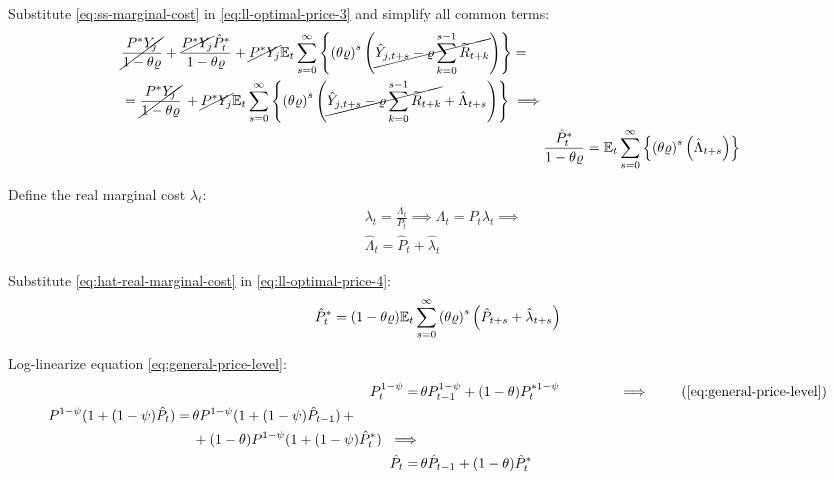 \documentclass[
	thesis.tex
	]{subfiles}
\begin{document}
Substitute \ref{eq:ss-marginal-cost} in \ref{eq:ll-optimal-price-3} and simplify all common terms:
\begin{align}
	\begin{split}
		& \cancel{\frac{P^\ast Y_{j}}{1-\theta\varrho}} + \frac{ \cancel{P^\ast Y_{j}} \hat{P}_t^\ast }{1- \theta \varrho} + \cancel{P^\ast Y_{j}} {\mathbb{E}_{t}} \sum_{s=0}^{\infty} \left\{ \left( \theta \varrho \right)^s \left( \cancel{\hat{Y}_{j,t+s} - \varrho \sum_{k=0}^{s-1} \widetilde{R}_{t+k}} \right) \right\} = 
		\\
		& = \cancel{\frac{P^\ast Y_{j}}{1-\theta\varrho}} \, + \cancel{P^\ast Y_{j}} {\mathbb{E}_{t}} \sum_{s=0}^{\infty} \left\{ \left( \theta \varrho \right)^s \left( \cancel{\hat{Y}_{j,t+s} - \varrho \sum_{k=0}^{s-1} \widetilde{R}_{t+k}} + \hat{\Lambda}_{t+s} \right) \right\} \implies	
	\end{split} \nonumber \\
	& \frac{ \hat{P}_t^\ast }{1- \theta \varrho} = {\mathbb{E}_{t}} \sum_{s=0}^{\infty} \left\{ \left( \theta \varrho \right)^s \left( \hat{\Lambda}_{t+s} \right) \right\} \label{eq:ll-optimal-price-4}
\end{align}

Define the real marginal cost $\lambda_t$:
\begin{align}
	& \lambda_t = \frac{\Lambda_t}{P_t} \implies \Lambda_t = P_t \lambda_t \implies \nonumber \\
	& \hat{\Lambda}_t = \hat{P}_t + \hat{\lambda}_t \label{eq:hat-real-marginal-cost}
\end{align}

Substitute \ref{eq:hat-real-marginal-cost} in \ref{eq:ll-optimal-price-4}:
\begin{align}
	\hat{P}_t^\ast = (1- \theta \varrho) {\mathbb{E}_{t}} \sum_{s=0}^{\infty} \left( \theta \varrho \right)^s \left( \hat{P}_{t+s} + \hat{\lambda}_{t+s} \right) \label{eq:ll-optimal-price-5}
\end{align}

Log-linearize equation \ref{eq:general-price-level}:
\begin{align}
	P_t^{1-\psi} =\, &\theta P_{t-1}^{1-\psi} + (1-\theta) P_t^{\ast 1-\psi} \qquad \qquad \implies \tag{\ref{eq:general-price-level}} \\
	\begin{split} P^{1-\psi} (1 + (1-\psi)\hat{P}_t) =\, &\theta P^{1-\psi} (1 + (1-\psi)\hat{P}_{t-1}) \, + \\ & + (1-\theta) P^{1-\psi} (1 + (1-\psi)\hat{P}_t^\ast) \ \implies \nonumber \end{split} \\
	\hat{P}_t =\, &\theta \hat{P}_{t-1} + (1-\theta) \hat{P}_t^\ast
	\label{eq:ll-general-price-level}
\end{align}
\end{document}
